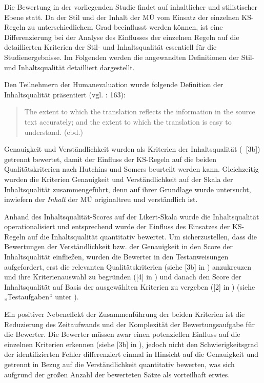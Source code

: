 Die Bewertung in der vorliegenden Studie findet auf inhaltlicher und stilistischer Ebene statt. Da der Stil und der Inhalt der MÜ vom Einsatz der einzelnen KS-Regeln zu unterschiedlichem Grad beeinflusst werden können, ist eine Differenzierung bei der Analyse des Einflusses der einzelnen Regeln auf die detaillierten Kriterien der Stil- und Inhaltsqualität essentiell für die Studienergebnisse. Im Folgenden werden die angewandten Definitionen der Stil- und Inhaltsqualität detailliert dargestellt.

Den Teilnehmern der Humanevaluation wurde folgende Definition der Inhaltsqualität präsentiert (vgl. \citealt{HutchinsSomers1992}: 163):
\begin{quote}
The extent to which the translation reflects the information in the source text accurately; and the extent to which the translation is easy to understand. (ebd.)
\end{quote}

Genauigkeit und Verständlichkeit wurden als Kriterien der Inhaltsqualität (~[3b]) getrennt bewertet, damit der Einfluss der KS-Regeln auf die beiden Qualitätskriterien nach Hutchins und Somers beurteilt werden kann. Gleichzeitig wurden die Kriterien Genauigkeit und Verständlichkeit auf der Skala der Inhaltsqualität zusammengeführt, denn auf ihrer Grundlage wurde untersucht, inwiefern der \textit{Inhalt} der MÜ originaltreu und verständlich ist.

Anhand des Inhaltsqualität-Scores auf der Likert-Skala wurde die Inhaltsqualität operationalisiert und entsprechend wurde der Einfluss des Einsatzes der KS-Regeln auf die Inhaltsqualität quantitativ bewertet. Um sicherzustellen, dass die Bewertungen der Verständlichkeit bzw. der Genauigkeit in den Score der Inhaltsqualität einfließen, wurden die Bewerter in den Testanweisungen aufgefordert, erst die relevanten Qualitätskriterien (siehe [3b] in ) anzukreuzen und ihre Kriterienauswahl zu begründen ([4] in ) und danach den Score der Inhaltsqualität auf Basis der ausgewählten Kriterien zu vergeben ([2] in ) (siehe „Testaufgaben“ unter ).

Ein positiver Nebeneffekt der Zusammenführung der beiden Kriterien ist die Reduzierung des Zeitaufwands und der Komplexität der Bewertungsaufgabe für die Bewerter. Die Bewerter müssen zwar einen potenziellen Einfluss auf die einzelnen Kriterien erkennen (siehe [3b] in ), jedoch nicht den Schwierigkeitsgrad der identifizierten Fehler differenziert einmal in Hinsicht auf die Genauigkeit und getrennt in Bezug auf die Verständlichkeit quantitativ bewerten, was sich aufgrund der großen Anzahl der bewerteten Sätze als vorteilhaft erwies.

